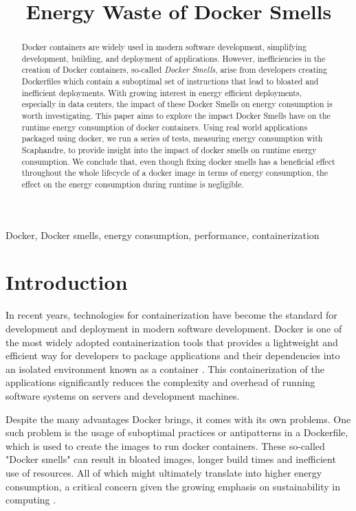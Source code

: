 \documentclass[conference]{IEEEtran}
\title{Energy Waste of Docker Smells}
\author{
    \IEEEauthorblockN{Alexander Zwisler}
    \IEEEauthorblockA{
        \textit{Faculty of Mathematics and Computer Science} \\
        \textit{University of Leipzig} \\
        az11kyho@sudserv.uni-leipzig.de
    }
}
\begin{document}
\maketitle
\begin{abstract}
Docker containers are widely used in modern software development, simplifying development, building, and deployment of applications. However, inefficiencies in the creation of Docker containers, so-called \textit{Docker Smells}, arise from developers creating Dockerfiles which contain a suboptimal set of instructions that lead to bloated and inefficient deployments. With growing interest in energy efficient deployments, especially in data centers, the impact of these Docker Smells on energy consumption is worth investigating. This paper aims to explore the impact Docker Smells have on the runtime energy consumption of docker containers. Using real world applications packaged using docker, we run a series of tests, measuring energy consumption with Scaphandre, to provide insight into the impact of docker smells on runtime energy consumption. We conclude that, even though fixing docker smells has a beneficial effect throughout the whole lifecycle of a docker image in terms of energy consumption, the effect on the energy consumption during runtime is negligible.
\end{abstract}

\begin{IEEEkeywords}
Docker, Docker smells, energy consumption, performance, containerization
\end{IEEEkeywords}
\section{Introduction}
In recent years, technologies for containerization have become the standard for development and deployment in modern software development. Docker is one of the most widely adopted containerization tools that provides a lightweight and efficient way for developers to package applications and their dependencies into an isolated environment known as a container \cite{merkel2014docker}. This containerization of the applications significantly reduces the complexity and overhead of running software systems on servers and development machines.

Despite the many advantages Docker brings, it comes with its own problems. One such problem is the usage of suboptimal practices or antipatterns in a Dockerfile, which is used to create the images to run docker containers. These so-called "Docker smells" \cite{durieuxEmpericalStudy} can result in bloated images, longer build times and inefficient use of resources. All of which might ultimately translate into higher energy consumption, a critical concern given the growing emphasis on sustainability in computing \cite{baliga2011green}.
\end{document}
